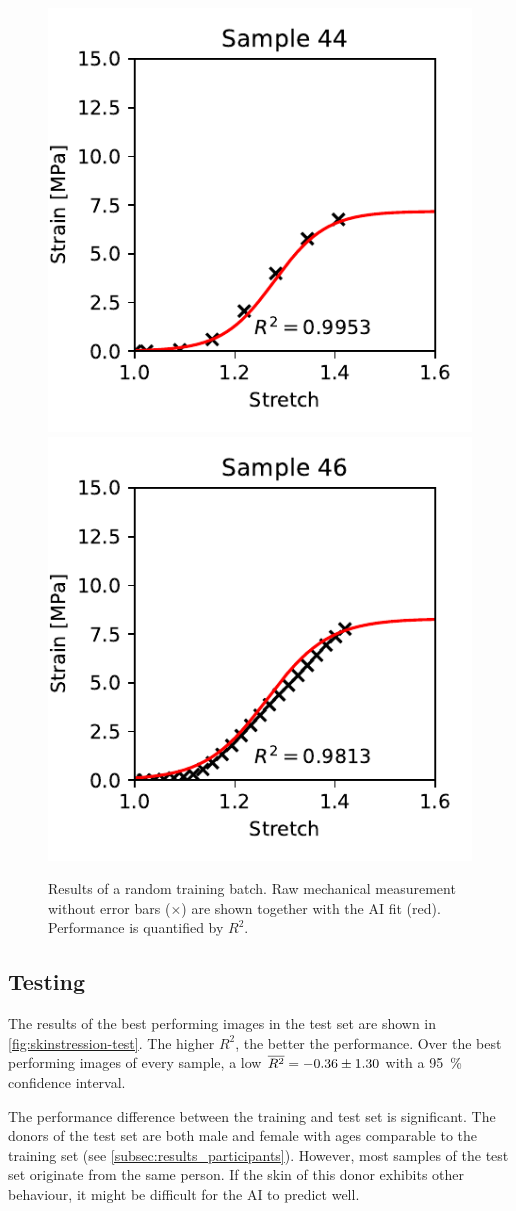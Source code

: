 \begin{figure}
    \includegraphics[width=0.24\linewidth]{skinstression/images/training/sample_44_1.pdf}
    \includegraphics[width=0.24\linewidth]{skinstression/images/training/sample_46_0.pdf}
    \caption[Training results]{
        Results of a random training batch.
        Raw mechanical measurement without error bars ($\times$) are shown together with the AI fit (red).
        Performance is quantified by $R^2$.
    }
    \label{fig:skinstression-train-logistic-curves}
\end{figure}

\subsection{Testing}
The results of the best performing images in the test set are shown in \cref{fig:skinstression-test}.
The higher $R^2$, the better the performance.
Over the best performing images of every sample, a low $\overline{R^2} = \num{-0.36 \pm 1.3}$ with a \qty{95}{\percent} confidence interval.

The performance difference between the training and test set is significant.
The donors of the test set are both male and female with ages comparable to the training set (see \cref{subsec:results_participants}).
However, most samples of the test set originate from the same person.
If the skin of this donor exhibits other behaviour, it might be difficult for the AI to predict well.

